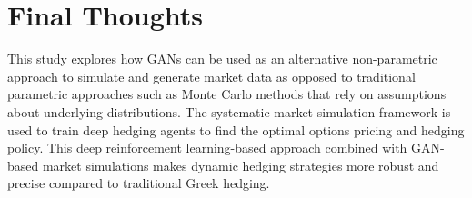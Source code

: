 \section{Final Thoughts}
This study explores how GANs can be used as an alternative non-parametric approach to simulate and generate market data as opposed to traditional parametric approaches such as Monte Carlo methods that rely on assumptions about underlying distributions. The systematic market simulation framework is used to train deep hedging agents to find the optimal options pricing and hedging policy. This deep reinforcement learning-based approach combined with GAN-based market simulations makes dynamic hedging strategies more robust and precise compared to traditional Greek hedging.
